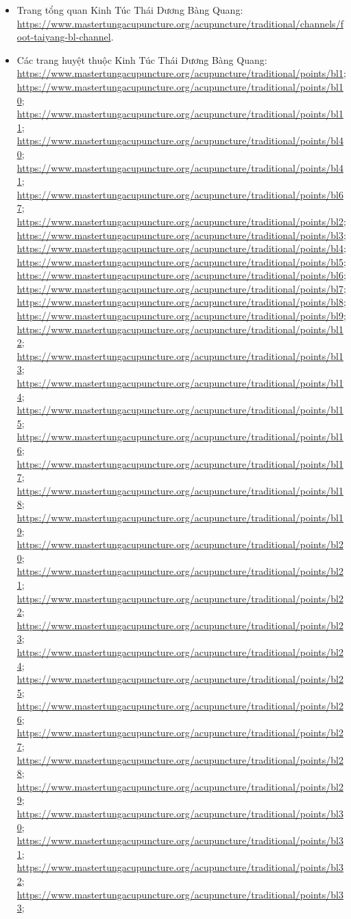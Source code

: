 \documentclass[12pt,a4paper]{article}
\begin{document}
\begin{itemize}
  \item Trang tổng quan Kinh Túc Thái Dương Bàng Quang: \url{https://www.mastertungacupuncture.org/acupuncture/traditional/channels/foot-taiyang-bl-channel}.
  \item Các trang huyệt thuộc Kinh Túc Thái Dương Bàng Quang: \url{https://www.mastertungacupuncture.org/acupuncture/traditional/points/bl1}; \url{https://www.mastertungacupuncture.org/acupuncture/traditional/points/bl10}; \url{https://www.mastertungacupuncture.org/acupuncture/traditional/points/bl11}; \url{https://www.mastertungacupuncture.org/acupuncture/traditional/points/bl40}; \url{https://www.mastertungacupuncture.org/acupuncture/traditional/points/bl41}; \url{https://www.mastertungacupuncture.org/acupuncture/traditional/points/bl67}; \url{https://www.mastertungacupuncture.org/acupuncture/traditional/points/bl2}; \url{https://www.mastertungacupuncture.org/acupuncture/traditional/points/bl3}; \url{https://www.mastertungacupuncture.org/acupuncture/traditional/points/bl4}; \url{https://www.mastertungacupuncture.org/acupuncture/traditional/points/bl5}; \url{https://www.mastertungacupuncture.org/acupuncture/traditional/points/bl6}; \url{https://www.mastertungacupuncture.org/acupuncture/traditional/points/bl7}; \url{https://www.mastertungacupuncture.org/acupuncture/traditional/points/bl8}; \url{https://www.mastertungacupuncture.org/acupuncture/traditional/points/bl9}; \url{https://www.mastertungacupuncture.org/acupuncture/traditional/points/bl12}; \url{https://www.mastertungacupuncture.org/acupuncture/traditional/points/bl13}; \url{https://www.mastertungacupuncture.org/acupuncture/traditional/points/bl14}; \url{https://www.mastertungacupuncture.org/acupuncture/traditional/points/bl15}; \url{https://www.mastertungacupuncture.org/acupuncture/traditional/points/bl16}; \url{https://www.mastertungacupuncture.org/acupuncture/traditional/points/bl17}; \url{https://www.mastertungacupuncture.org/acupuncture/traditional/points/bl18}; \url{https://www.mastertungacupuncture.org/acupuncture/traditional/points/bl19}; \url{https://www.mastertungacupuncture.org/acupuncture/traditional/points/bl20}; \url{https://www.mastertungacupuncture.org/acupuncture/traditional/points/bl21}; \url{https://www.mastertungacupuncture.org/acupuncture/traditional/points/bl22}; \url{https://www.mastertungacupuncture.org/acupuncture/traditional/points/bl23}; \url{https://www.mastertungacupuncture.org/acupuncture/traditional/points/bl24}; \url{https://www.mastertungacupuncture.org/acupuncture/traditional/points/bl25}; \url{https://www.mastertungacupuncture.org/acupuncture/traditional/points/bl26}; \url{https://www.mastertungacupuncture.org/acupuncture/traditional/points/bl27}; \url{https://www.mastertungacupuncture.org/acupuncture/traditional/points/bl28}; \url{https://www.mastertungacupuncture.org/acupuncture/traditional/points/bl29}; \url{https://www.mastertungacupuncture.org/acupuncture/traditional/points/bl30}; \url{https://www.mastertungacupuncture.org/acupuncture/traditional/points/bl31}; \url{https://www.mastertungacupuncture.org/acupuncture/traditional/points/bl32}; \url{https://www.mastertungacupuncture.org/acupuncture/traditional/points/bl33}; 
\end{itemize}
\end{document}
